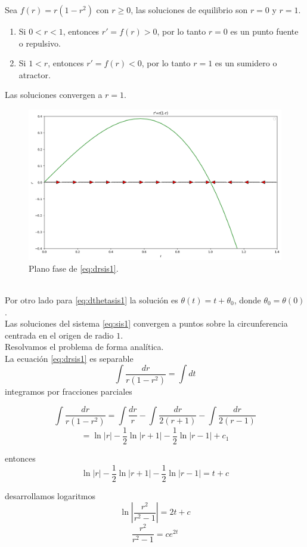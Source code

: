 \documentclass[12pt, a4paper]{report}
\begin{document}
Sea $f(r)=r(1-r^2)$ con $r\geq0$, las soluciones de equilibrio son $r=0$ y $r=1$.
\begin{enumerate}
	\item Si $0<r<1$, entonces $r'=f(r)>0$, por lo tanto $r=0$ es un punto fuente o repulsivo.
	\item Si $1<r$, entonces $r'=f(r)<0$, por lo tanto $r=1$ es un sumidero o atractor.
\end{enumerate}

Las soluciones convergen a $r=1$.
\begin{figure}[h]
	\centering
	\includegraphics[width=14cm]{rej1.png}
	\caption{Plano fase de \eqref{eq:drsis1}.}
\end{figure}\\


Por otro lado para \eqref{eq:dthetasis1} la solución es $\theta(t)=t+\theta_0$,
donde $\theta_0=\theta(0)$.\\

Las soluciones del sistema \eqref{eq:sis1} convergen a puntos sobre la
circunferencia centrada en el origen de radio $1$.\\

Resolvamos el problema de forma analítica.\\

La ecuación \eqref{eq:drsis1} es separable
$$\int\frac{dr}{r(1-r^2)}=\int dt$$
integramos por fracciones parciales

$$\int\frac{dr}{r(1-r^2)}=\int\frac{dr}{r}-\int\frac{dr}{2(r+1)}-\int\frac{dr}{2(r-1)}$$
$$=\ln |r|-\frac{1}{2}\ln|r+1|-\frac{1}{2}\ln|r-1|+c_1$$

entonces
$$\ln |r|-\frac{1}{2}\ln|r+1|-\frac{1}{2}\ln|r-1|=t+c$$

desarrollamos logaritmos
$$\ln\left\lvert\frac{r^2}{r^2-1}\right\rvert=2t+c$$
$$\frac{r^2}{r^2-1}=ce^{2t}$$
\end{document}
